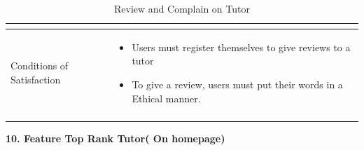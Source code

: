 \begin{center}
\begin{longtable}{|m{70pt}|p{9cm}|}
\begin{itemize}
                        \end{itemize}\\
            \hline
                Conditions of Satisfaction &
                    \begin{itemize}
                        \item  Users must register themselves to give  reviews to a tutor
                        \item To give a review, users must put their words in a Ethical manner.
                    \end{itemize} \\
            \hline
        \caption{Review and Complain on Tutor}
        \label{tab:my_label}
        \end{longtable}
\end{center}
\textbf{10. Feature Top Rank Tutor( On homepage)}
